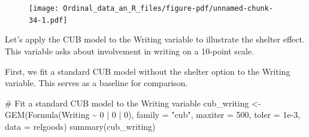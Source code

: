 \documentclass[
  letterpaper,
  DIV=11,
  numbers=noendperiod]{scrartcl}
\newenvironment{Shaded}{\begin{snugshade}}{\end{snugshade}}
\newcommand{\AttributeTok}[1]{\textcolor[rgb]{0.40,0.45,0.13}{#1}}
\newcommand{\CommentTok}[1]{\textcolor[rgb]{0.37,0.37,0.37}{#1}}
\newcommand{\DecValTok}[1]{\textcolor[rgb]{0.68,0.00,0.00}{#1}}
\newcommand{\FloatTok}[1]{\textcolor[rgb]{0.68,0.00,0.00}{#1}}
\newcommand{\FunctionTok}[1]{\textcolor[rgb]{0.28,0.35,0.67}{#1}}
\newcommand{\NormalTok}[1]{\textcolor[rgb]{0.00,0.23,0.31}{#1}}
\newcommand{\OtherTok}[1]{\textcolor[rgb]{0.00,0.23,0.31}{#1}}
\newcommand{\SpecialCharTok}[1]{\textcolor[rgb]{0.37,0.37,0.37}{#1}}
\newcommand{\StringTok}[1]{\textcolor[rgb]{0.13,0.47,0.30}{#1}}
\begin{document}
\begin{Shaded}
\end{Shaded}

\begin{figure}[H]

{\centering \texttt{[image: Ordinal\_data\_an\_R\_files/figure-pdf/unnamed-chunk-34-1.pdf]}

}

\end{figure}

Let's apply the CUB model to the Writing variable to illustrate the
shelter effect. This variable asks about involvement in writing on a
10-point scale.

First, we fit a standard CUB model without the shelter option to the
Writing variable. This serves as a baseline for comparison.

\begin{Shaded}
\begin{Highlighting}[]
\CommentTok{\# Fit a standard CUB model to the \textquotesingle{}Writing\textquotesingle{} variable}
\NormalTok{cub\_writing }\OtherTok{\textless{}{-}} \FunctionTok{GEM}\NormalTok{(}\FunctionTok{Formula}\NormalTok{(Writing }\SpecialCharTok{\textasciitilde{}} \DecValTok{0} \SpecialCharTok{|} \DecValTok{0} \SpecialCharTok{|} \DecValTok{0}\NormalTok{), }\AttributeTok{family =} \StringTok{"cub"}\NormalTok{,}
                  \AttributeTok{maxiter =} \DecValTok{500}\NormalTok{, }\AttributeTok{toler =} \FloatTok{1e{-}3}\NormalTok{, }\AttributeTok{data =}\NormalTok{ relgoods)}
\FunctionTok{summary}\NormalTok{(cub\_writing)}
\end{Highlighting}
\end{Shaded}
\end{document}
